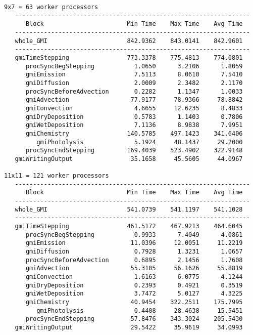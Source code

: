 \begin{verbatim}
9x7 = 63 worker processors
   -----------------------------------------------------------------
      Block                       Min Time    Max Time    Avg Time
   -----------------------------------------------------------------
   whole_GMI                      842.9362    843.0141    842.9601
   -----------------------------------------------------------------
   gmiTimeStepping                773.3378    775.4813    774.0801
      procSyncBegStepping           1.0650      3.2106      1.8059
      gmiEmission                   7.5113      8.0610      7.5410
      gmiDiffusion                  2.0009      2.3482      2.1170
      procSyncBeforeAdvection       0.2282      1.1347      1.0033
      gmiAdvection                 77.9177     78.9366     78.8842
      gmiConvection                 4.6655     12.6235      8.4833
      gmiDryDeposition              0.5783      1.1403      0.7806
      gmiWetDeposition              7.1136      8.9838      7.9951
      gmiChemistry                140.5785    497.1423    341.6406
         gmiPhotolysis              5.1924     48.1437     29.2000
      procSyncEndStepping         169.4039    523.4902    322.9148
   gmiWritingOutput                35.1658     45.5605     44.0967

11x11 = 121 worker processors
   -----------------------------------------------------------------
      Block                       Min Time    Max Time    Avg Time
   -----------------------------------------------------------------
   whole_GMI                      541.0739    541.1197    541.1028
   -----------------------------------------------------------------
   gmiTimeStepping                461.5172    467.9213    464.6045
      procSyncBegStepping           0.9933      7.4049      4.0861
      gmiEmission                  11.0396     12.0051     11.2219
      gmiDiffusion                  0.7928      1.3231      1.0657
      procSyncBeforeAdvection       0.6895      2.1456      1.7608
      gmiAdvection                 55.3105     56.1626     55.8819
      gmiConvection                 1.6163      6.0775      4.1244
      gmiDryDeposition              0.2393      0.4921      0.3519
      gmiWetDeposition              3.7472      5.0127      4.3225
      gmiChemistry                 40.9454    322.2511    175.7995
         gmiPhotolysis              0.4408     28.4638     15.5451
      procSyncEndStepping          57.8476    343.3024    205.5430
   gmiWritingOutput                29.5422     35.9619     34.0993
\end{verbatim}
